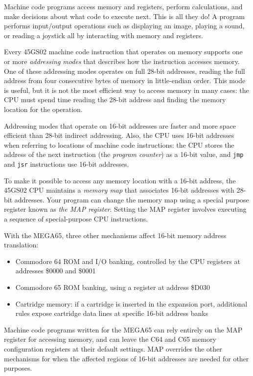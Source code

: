 Machine code programs access memory and registers, perform calculations, and make decisions about what code to execute next. This is all they do! A program performs input/output operations such as displaying an image, playing a sound, or reading a joystick all by interacting with memory and registers.

Every 45GS02 machine code instruction that operates on memory supports one or more {\em addressing modes} that describes how the instruction accesses memory. One of these addressing modes operates on full 28-bit addresses, reading the full address from four consecutive bytes of memory in little-endian order. This mode is useful, but it is not the most efficient way to access memory in many cases: the CPU must spend time reading the 28-bit address and finding the memory location for the operation.

Addressing modes that operate on 16-bit addresses are faster and more space efficient than 28-bit indirect addressing. Also, the CPU uses 16-bit addresses when referring to locations of machine code instructions: the CPU stores the address of the next instruction (the {\em program counter}) as a 16-bit value, and \texttt{jmp} and \texttt{jsr} instructions use 16-bit addresses.

To make it possible to access any memory location with a 16-bit address, the 45GS02 CPU maintains a {\em memory map} that associates 16-bit addresses with 28-bit addresses. Your program can change the memory map using a special purpose register known as {\em the MAP register}. Setting the MAP register involves executing a sequence of special-purpose CPU instructions.

With the MEGA65, three other mechanisms affect 16-bit memory address translation:

\begin{itemize}
\item Commodore 64 ROM and I/O banking, controlled by the CPU registers at addresses \$0000 and \$0001
\item Commodore 65 ROM banking, using a register at address \$D030
\item Cartridge memory: if a cartridge is inserted in the expansion port, additional rules expose cartridge data lines at specific 16-bit address banks
\end{itemize}

Machine code programs written for the MEGA65 can rely entirely on the MAP register for accessing memory, and can leave the C64 and C65 memory configuration registers at their default settings. MAP overrides the other mechanisms for when the affected regions of 16-bit addresses are needed for other purposes.

